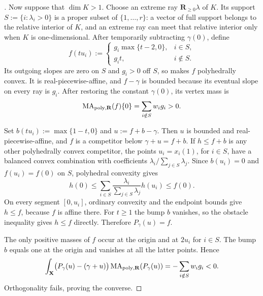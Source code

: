 \begin{proof}[]
Now suppose that $\dim K>1$.  Choose an extreme ray
$\mathbf R_{\geq0}\lambda$ of $K$.  Its support
$
 S:=\{i:\lambda_i>0\}
$
is a proper subset of $\{1,\ldots,r\}$: a vector of full support belongs
to the relative interior of $K$, and an extreme ray can meet that
relative interior only when $K$ is one-dimensional.  After temporarily
subtracting $\gamma(0)$, define
\[
 f(tu_i):=
 \begin{cases}
   g_i\max\{t-2,0\},&i\in S,\\
   g_i t,&i\notin S.
 \end{cases}
\]
Its outgoing slopes are zero on $S$ and $g_i>0$ off $S$, so
 makes $f$
polyhedrally convex.  It is real-piecewise-affine, and
$f-\gamma$ is bounded because its eventual slope on every ray is $g_i$.
After restoring the constant $\gamma(0)$, its vertex mass is
\[
             \operatorname{MA}_{\mathrm{poly},\mathbf R}(f)\{0\}
             =\sum_{i\notin S}w_i g_i>0.
\]

Set $b(tu_i):=\max\{1-t,0\}$ and $u:=f+b-\gamma$.  Then $u$ is
bounded and real-piecewise-affine, and $f$ is a competitor below
$\gamma+u=f+b$.  If $h\leq f+b$ is any other polyhedrally convex
competitor, the points $u_i=x_i(1)$, for $i\in S$, have a balanced
convex combination with coefficients
$
 \lambda_i/\sum_{j\in S}\lambda_j
$.
Since $b(u_i)=0$ and $f(u_i)=f(0)$ on $S$, polyhedral convexity gives
\[
 h(0)\leq
 \sum_{i\in S}\frac{\lambda_i}{\sum_{j\in S}\lambda_j}h(u_i)
 \leq f(0).
\]
On every segment $[0,u_i]$, ordinary convexity and the endpoint bounds
give $h\leq f$, because $f$ is affine there.  For $t\geq1$ the bump
$b$ vanishes, so the obstacle inequality gives $h\leq f$ directly.
Therefore $P_\gamma(u)=f$.

The only positive masses of $f$ occur at the origin and at $2u_i$ for
$i\in S$.  The bump $b$ equals one at the origin and vanishes at all
the latter points.  Hence
\[
 \int_{\mathbf X}
 \bigl(P_\gamma(u)-(\gamma+u)\bigr)
 \operatorname{MA}_{\mathrm{poly},\mathbf R}(P_\gamma(u))
 =-\sum_{i\notin S}w_i g_i<0.
\]
Orthogonality fails, proving the converse.
\end{proof}

